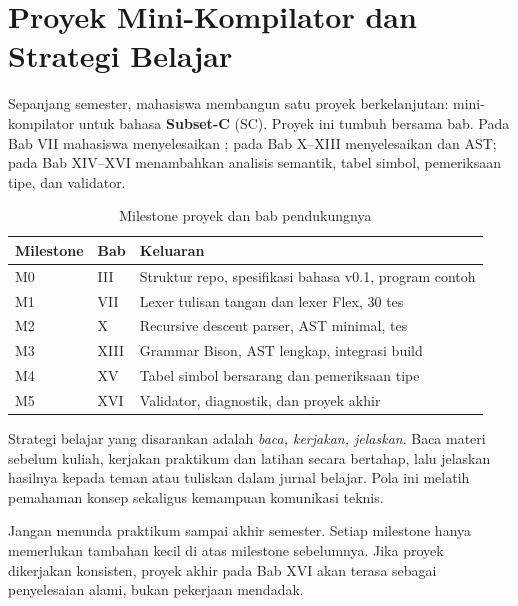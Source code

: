 \section{Proyek Mini-Kompilator dan Strategi Belajar}
\label{sec:ch01-proyek}

Sepanjang semester, mahasiswa membangun satu proyek berkelanjutan:
mini-kompilator untuk bahasa \textbf{Subset-C} (SC). Proyek ini tumbuh
bersama bab. Pada Bab VII mahasiswa menyelesaikan ; pada
Bab X--XIII menyelesaikan  dan AST; pada Bab XIV--XVI
menambahkan analisis semantik, tabel simbol, pemeriksaan tipe, dan
validator.

\begin{table}[H]
\centering
\caption{Milestone proyek dan bab pendukungnya}
\label{tab:ch01-milestone}
\begin{tabularx}{\textwidth}{@{}llX@{}}
\toprule
\textbf{Milestone} & \textbf{Bab} & \textbf{Keluaran} \\
\midrule
M0 & III & Struktur repo, spesifikasi bahasa v0.1, program contoh \\
M1 & VII & Lexer tulisan tangan dan lexer Flex, 30 tes \\
M2 & X & Recursive descent parser, AST minimal, tes \\
M3 & XIII & Grammar Bison, AST lengkap, integrasi build \\
M4 & XV & Tabel simbol bersarang dan pemeriksaan tipe \\
M5 & XVI & Validator, diagnostik, dan proyek akhir \\
\bottomrule
\end{tabularx}
\end{table}

Strategi belajar yang disarankan adalah \emph{baca, kerjakan, jelaskan}.
Baca materi sebelum kuliah, kerjakan praktikum dan latihan secara
bertahap, lalu jelaskan hasilnya kepada teman atau tuliskan dalam
jurnal belajar. Pola ini melatih pemahaman konsep sekaligus kemampuan
komunikasi teknis.

\begin{tipsbox}
Jangan menunda praktikum sampai akhir semester. Setiap milestone hanya
memerlukan tambahan kecil di atas milestone sebelumnya. Jika proyek
dikerjakan konsisten, proyek akhir pada Bab XVI akan terasa sebagai
penyelesaian alami, bukan pekerjaan mendadak.
\end{tipsbox}

